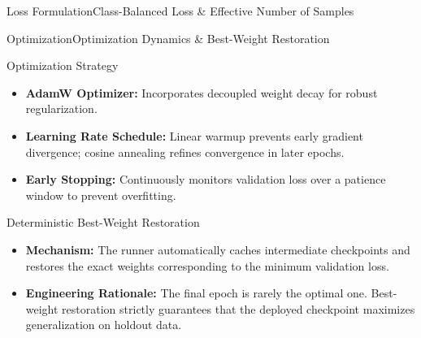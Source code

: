 \begin{frame}{Loss Formulation}{Class-Balanced Loss \& Effective Number of Samples}
\end{frame}

\begin{frame}{Optimization}{Optimization Dynamics \& Best-Weight Restoration}
    \begin{block}{Optimization Strategy}
        \footnotesize
        \begin{itemize}
            \item \textbf{AdamW Optimizer:} Incorporates decoupled weight decay for robust regularization.
            \item \textbf{Learning Rate Schedule:} Linear warmup prevents early gradient divergence; cosine annealing refines convergence in later epochs.
            \item \textbf{Early Stopping:} Continuously monitors validation loss over a patience window to prevent overfitting.
        \end{itemize}
    \end{block}

    \begin{block}{Deterministic Best-Weight Restoration}
        \footnotesize
        \begin{itemize}
            \item \textbf{Mechanism:} The runner automatically caches intermediate checkpoints and restores the exact weights corresponding to the minimum validation loss.
            \item \textbf{Engineering Rationale:} The final epoch is rarely the optimal one. Best-weight restoration strictly guarantees that the deployed checkpoint maximizes generalization on holdout data.
        \end{itemize}
    \end{block}


\end{frame}
